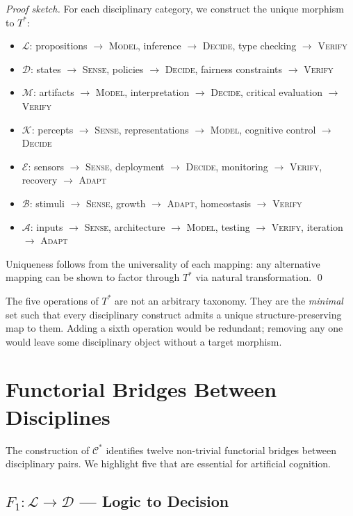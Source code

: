 \documentclass[11pt,a4paper]{article}
\begin{document}
\begin{proof}[Proof sketch]
For each disciplinary category, we construct the unique morphism to $T^*$:
\begin{itemize}[nosep]
  \item $\mathcal{L}$: propositions $\to$ \textsc{Model}, inference $\to$ \textsc{Decide}, type checking $\to$ \textsc{Verify}
  \item $\mathcal{D}$: states $\to$ \textsc{Sense}, policies $\to$ \textsc{Decide}, fairness constraints $\to$ \textsc{Verify}
  \item $\mathcal{M}$: artifacts $\to$ \textsc{Model}, interpretation $\to$ \textsc{Decide}, critical evaluation $\to$ \textsc{Verify}
  \item $\mathcal{K}$: percepts $\to$ \textsc{Sense}, representations $\to$ \textsc{Model}, cognitive control $\to$ \textsc{Decide}
  \item $\mathcal{E}$: sensors $\to$ \textsc{Sense}, deployment $\to$ \textsc{Decide}, monitoring $\to$ \textsc{Verify}, recovery $\to$ \textsc{Adapt}
  \item $\mathcal{B}$: stimuli $\to$ \textsc{Sense}, growth $\to$ \textsc{Adapt}, homeostasis $\to$ \textsc{Verify}
  \item $\mathcal{A}$: inputs $\to$ \textsc{Sense}, architecture $\to$ \textsc{Model}, testing $\to$ \textsc{Verify}, iteration $\to$ \textsc{Adapt}
\end{itemize}
Uniqueness follows from the universality of each mapping: any alternative mapping can be shown to factor through $T^*$ via natural transformation. \qed
\end{proof}

The five operations of $T^*$ are not an arbitrary taxonomy. They are the \emph{minimal} set such that every disciplinary construct admits a unique structure-preserving map to them. Adding a sixth operation would be redundant; removing any one would leave some disciplinary object without a target morphism.

\section{Functorial Bridges Between Disciplines}
\label{sec:bridges}

The construction of $\mathcal{C}^*$ identifies twelve non-trivial functorial bridges between disciplinary pairs. We highlight five that are essential for artificial cognition.

\subsection{$F_1: \mathcal{L} \to \mathcal{D}$ --- Logic to Decision}
\end{document}
